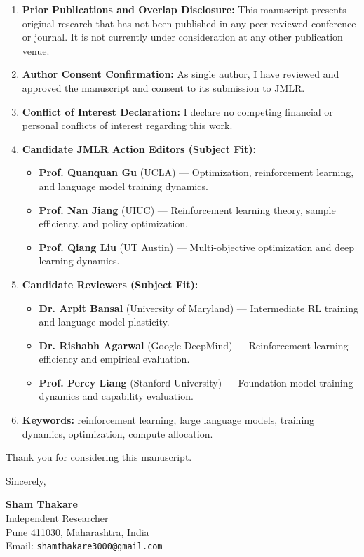 \documentclass[11pt]{article}
\begin{document}
\begin{enumerate}
    \item \textbf{Prior Publications and Overlap Disclosure:}  
    This manuscript presents original research that has not been published in any peer-reviewed conference or journal. It is not currently under consideration at any other publication venue.

    \item \textbf{Author Consent Confirmation:}  
    As single author, I have reviewed and approved the manuscript and consent to its submission to JMLR.

    \item \textbf{Conflict of Interest Declaration:}  
    I declare no competing financial or personal conflicts of interest regarding this work.

    \item \textbf{Candidate JMLR Action Editors (Subject Fit):}  
    \begin{itemize}
        \item \textbf{Prof. Quanquan Gu} (UCLA) — Optimization, reinforcement learning, and language model training dynamics.
        \item \textbf{Prof. Nan Jiang} (UIUC) — Reinforcement learning theory, sample efficiency, and policy optimization.
        \item \textbf{Prof. Qiang Liu} (UT Austin) — Multi-objective optimization and deep learning dynamics.
    \end{itemize}

    \item \textbf{Candidate Reviewers (Subject Fit):}  
    \begin{itemize}
        \item \textbf{Dr. Arpit Bansal} (University of Maryland) — Intermediate RL training and language model plasticity.
        \item \textbf{Dr. Rishabh Agarwal} (Google DeepMind) — Reinforcement learning efficiency and empirical evaluation.
        \item \textbf{Prof. Percy Liang} (Stanford University) — Foundation model training dynamics and capability evaluation.
    \end{itemize}

    \item \textbf{Keywords:}  
    reinforcement learning, large language models, training dynamics, optimization, compute allocation.
\end{enumerate}

\vspace{1em}

\noindent Thank you for considering this manuscript.

\vspace{1.5em}

\noindent Sincerely,

\vspace{1em}

\noindent \textbf{Sham Thakare} \\
Independent Researcher \\
Pune 411030, Maharashtra, India \\
Email: \texttt{shamthakare3000@gmail.com}
\end{document}

